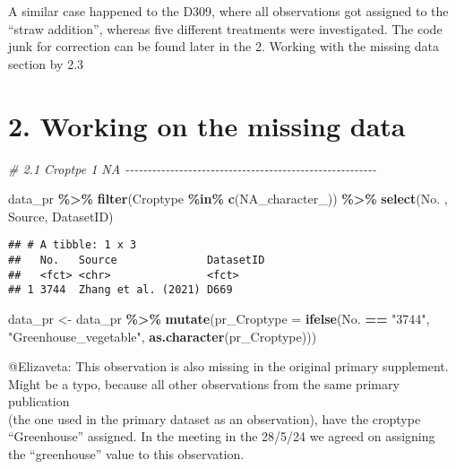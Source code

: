 \documentclass[
]{article}
\newenvironment{Shaded}{\begin{snugshade}}{\end{snugshade}}
\newcommand{\AttributeTok}[1]{\textcolor[rgb]{0.13,0.29,0.53}{#1}}
\newcommand{\CommentTok}[1]{\textcolor[rgb]{0.56,0.35,0.01}{\textit{#1}}}
\newcommand{\ConstantTok}[1]{\textcolor[rgb]{0.56,0.35,0.01}{#1}}
\newcommand{\FunctionTok}[1]{\textcolor[rgb]{0.13,0.29,0.53}{\textbf{#1}}}
\newcommand{\NormalTok}[1]{#1}
\newcommand{\OtherTok}[1]{\textcolor[rgb]{0.56,0.35,0.01}{#1}}
\newcommand{\SpecialCharTok}[1]{\textcolor[rgb]{0.81,0.36,0.00}{\textbf{#1}}}
\newcommand{\StringTok}[1]{\textcolor[rgb]{0.31,0.60,0.02}{#1}}
\begin{document}
A similar case happened to the D309, where all observations got assigned
to the ``straw addition'', whereas five different treatments were
investigated. The code junk for correction can be found later in the 2.
Working with the missing data section by 2.3

\section{2. Working on the missing
data}\label{working-on-the-missing-data}

\begin{Shaded}
\begin{Highlighting}[]
\CommentTok{\# 2.1 Croptpe 1 NA {-}{-}{-}{-}{-}{-}{-}{-}{-}{-}{-}{-}{-}{-}{-}{-}{-}{-}{-}{-}{-}{-}{-}{-}{-}{-}{-}{-}{-}{-}{-}{-}{-}{-}{-}{-}{-}{-}{-}{-}{-}{-}{-}{-}{-}{-}{-}{-}{-}{-}{-}{-}{-}{-}{-}{-}}

\NormalTok{data\_pr }\SpecialCharTok{\%\textgreater{}\%} 
  \FunctionTok{filter}\NormalTok{(Croptype }\SpecialCharTok{\%in\%} \FunctionTok{c}\NormalTok{(}\ConstantTok{NA\_character\_}\NormalTok{)) }\SpecialCharTok{\%\textgreater{}\%} 
  \FunctionTok{select}\NormalTok{(No. , Source, DatasetID)}
\end{Highlighting}
\end{Shaded}

\begin{verbatim}
## # A tibble: 1 x 3
##   No.   Source              DatasetID
##   <fct> <chr>               <fct>    
## 1 3744  Zhang et al. (2021) D669
\end{verbatim}

\begin{Shaded}
\begin{Highlighting}[]
\NormalTok{data\_pr }\OtherTok{\textless{}{-}} 
\NormalTok{data\_pr }\SpecialCharTok{\%\textgreater{}\%} 
  \FunctionTok{mutate}\NormalTok{(}\AttributeTok{pr\_Croptype =} \FunctionTok{ifelse}\NormalTok{(No. }\SpecialCharTok{==} \StringTok{"3744"}\NormalTok{, }\StringTok{"Greenhouse\_vegetable"}\NormalTok{, }\FunctionTok{as.character}\NormalTok{(pr\_Croptype))) }
\end{Highlighting}
\end{Shaded}

@Elizaveta: This observation is also missing in the original primary
supplement.\\
Might be a typo, because all other observations from the same primary
publication\\
(the one used in the primary dataset as an observation), have the
croptype\\
``Greenhouse'' assigned. In the meeting in the 28/5/24 we agreed on
assigning\\
the ``greenhouse'' value to this observation.
\end{document}
